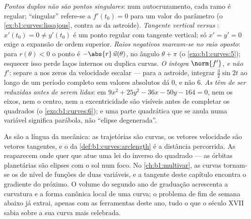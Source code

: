 \begin{remark}
\label{rem:b1:curves:pitfalls}
\emph{Pontos duplos não são pontos singulares}: num autocruzamento,
cada ramo é regular; ``singular'' refere-se a $f'(t_0) = 0$ para um valor do
parâmetro (o \cref{ex:b1:curves:lissajous}, contra as  da astroide).
\emph{Tangente vertical versus }: $x'(t_0) = 0 \neq y'(t_0)$ é um ponto regular com
tangente vertical; só $x' = y' = 0$ exige a expansão de ordem superior.
\emph{Raios negativos marcam-se no raio oposto}: para $r(\theta) <
0$ o ponto é
$-\abs{r}\,\vec u(\theta)$, no ângulo $\theta +
\pi$ (o \cref{exo:b1:curves:5}); esquecer isso perde laços internos
ou duplica curvas.
\emph{O  integra $\norm{f'}$, e não $f'$}: separe a
 nos zeros da velocidade escalar --- para a astroide,
integrar $\frac32\sin 2t$ ao longo de um período completo sem valores
absolutos dá $0$, e não $6$.
\emph{As  têm de ser reduzidas antes de serem lidas}: em
$9x^2 +
25y^2 - 36x - 50y - 164 = 0$, nem os eixos, nem o centro, nem a excentricidade são visíveis
antes de completar os quadrados (o \cref{exo:b1:curves:6}); e uma parte quadrática
que se anula numa variável significa parábola, não ``elipse
degenerada''.
\end{remark}

\begin{remark}
\label{rem:b1:curves:whereused}
As  são a língua da mecânica: as trajetórias são
curvas, os vetores velocidade são vetores tangentes, e o  da \cref{def:b1:curves:arclength} é a distância percorrida. As  reaparecem onde
quer que atue uma lei do inverso do quadrado --- as órbitas
planetárias são elipses com o sol num foco. No \cref{ch:b1:multivar}, as curvas
tornam-se os  de nível de funções de duas variáveis, e a
tangente deste capítulo encontra o gradiente do próximo. O volume do
segundo ano de graduação acrescenta a curvatura e a forma canônica
local de uma curva; o problema de fim de semana abaixo já extrai,
apenas com as ferramentas deste ano, tudo o que o século XVII sabia
sobre a sua curva mais celebrada.
\end{remark}

